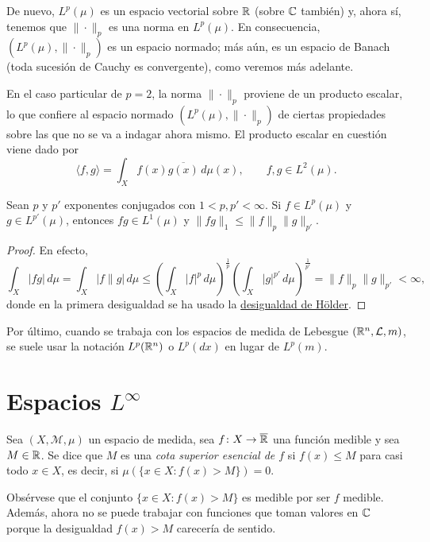 \documentclass[a4paper, 11pt, oneside]{report}
\begin{document}
De nuevo, $L^p(\mu)$ es un espacio vectorial sobre $\mathbb R$ (sobre $\mathbb C$ también) y, ahora sí, tenemos que $\|\cdot\|_p$ es una norma en $L^p(\mu)$. En consecuencia, $(L^p(\mu),\|\cdot\|_p)$ es un espacio normado; más aún, es un espacio de Banach (toda sucesión de Cauchy es convergente), como veremos más adelante.

En el caso particular de $p = 2$, la norma $\|\cdot\|_p$ proviene de un producto escalar, lo que confiere al espacio normado $(L^p(\mu),\|\cdot\|_p)$ de ciertas propiedades sobre las que no se va a indagar ahora mismo. El producto escalar en cuestión viene dado por
\[\langle f,g \rangle = \int_X f(x)\overline{g(x)} \, d\mu(x), \qquad f,g \in L^2(\mu).\]

\begin{proposition}\label{pro:1.3.1}
  Sean $p$ y $p'$ exponentes conjugados con $1 < p,p' < \infty$. Si $f \in L^p(\mu)$ y $g \in L^{p'}(\mu)$, entonces $fg \in L^1(\mu)$ y $\|fg\|_1 \leq \|f\|_p \|g\|_{p'}$.
\end{proposition}

\begin{proof}
  En efecto,
  \[\int_X |fg| \, d\mu = \int_X |f\|g| \, d\mu \leq \left(\int_X |f|^p \, d\mu\right)^{\frac{1}{p}}\left(\int_X |g|^{p'} \, d\mu\right)^{\frac{1}{p'}} = \|f\|_p\|g\|_{p'} < \infty,\]
  donde en la primera desigualdad se ha usado la \hyperref[teo:1.2.6]{\color{c1}desigualdad de Hölder}.
\end{proof}

Por último, cuando se trabaja con los espacios de medida de Lebesgue $(\mathbb R^n, \mathcal{L}, m)$, se suele usar la notación $L^p(\mathbb R^n)$ o $L^p(dx)$ en lugar de $L^p(m)$.

\section[Espacios \texorpdfstring{$L^\infty$}{L∞}]{Espacios \texorpdfstring{\boldmath$L^\infty$}{L∞}}

\begin{definition}
  Sea $(X, \mathcal{M},\mu)$ un espacio de medida, sea $f \colon X \to \overline{\mathbb R}$ una función medible y sea $M \in \mathbb R$. Se dice que $M$ es una \emph{cota superior esencial de $f$} si $f(x) \leq M$ para casi todo $x \in X$, es decir, si $\mu(\{x \in X \colon f(x) > M\}) = 0$.
\end{definition}

Obsérvese que el conjunto $\{x \in X \colon f(x)>M\}$ es medible por ser $f$ medible. Además, ahora no se puede trabajar con funciones que toman valores en $\mathbb C$ porque la desigualdad $f(x)>M$ carecería de sentido.
\end{document}
